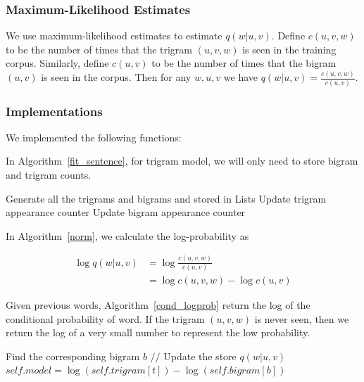 \subsubsection{\textbf{Maximum-Likelihood Estimates}}

\hfill 

We use maximum-likelihood estimates to estimate $q\left(w | u, v\right)$. Define $c(u, v, w)$ to be the number of times that the trigram $(u, v, w)$ is seen in the training corpus. Similarly, define $c(u, v)$ to be the number of times that the bigram $(u, v)$ is seen in the corpus. Then for any $w, u, v$ we have $q(w | u, v)=\frac{c(u, v, w)}{c(u, v)}$.

\subsubsection{\textbf{Implementations}}

We implemented the following functions:

In Algorithm~\ref{fit_sentence}, for trigram model, we will only need to store bigram and trigram counts.

\begin{algorithm}[]
  \caption{$fit\_sentence$}
  \label{fit_sentence}
  Generate all the trigrams and bigrams and stored in Lists\;
  {
    Update trigram appearance counter\;
  }
  {
    Update bigram appearance counter\;
  }
\end{algorithm}


In Algorithm~\ref{norm}, we calculate the log-probability as 

$$
\begin{aligned}
\log q(w | u, v)&=\log\frac{c(u, v, w)}{c(u, v)}\\
&=\log c(u, v, w) - \log c(u, v)
\end{aligned}
$$

Given previous words, Algorithm~\ref{cond_logprob} return the log of the conditional probability of word. If the trigram $(u, v, w)$ is never seen, then we return the log of a very small number to represent the low probability.

\begin{algorithm}[]
  \caption{$norm$}
  \label{norm}
  {
    Find the corresponding bigram $b$\;
    $//$ Update the store $q(w|u,v)$
    $self.model = \log(self.trigram[t]) - \log(self.bigram[b])$  
  }
\end{algorithm}

